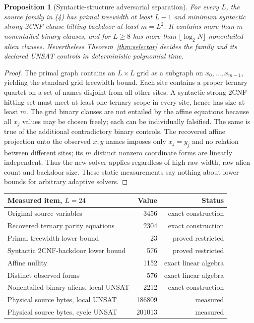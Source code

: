 \documentclass[11pt]{article}
\newtheorem{proposition}[theorem]{Proposition}
\begin{document}
\begin{proposition}[Syntactic-structure adversarial separation]
\label{prop:grid}
For every $L$, the source family in (4) has primal treewidth at least $L-1$
and minimum \emph{syntactic} strong-2CNF clause-hitting backdoor at least $m=L^2$.
It contains more than $m$ nonentailed binary clauses, and for $L\ge8$ has
more than $\lfloor\log_2 N\rfloor$ nonentailed alien clauses.
Nevertheless Theorem~\ref{thm:selector} decides the family and its declared
UNSAT controls in deterministic polynomial time.
\end{proposition}
\begin{proof}
The primal graph contains an $L\times L$ grid as a subgraph on
$x_0,\ldots,x_{m-1}$, yielding the standard grid treewidth bound.
Each site contains a proper ternary quartet on a set of names disjoint
from all other sites. A syntactic strong-2CNF hitting set must meet at
least one ternary scope in every site, hence has size at least $m$.
The grid binary clauses are not entailed by the affine equations because
all $x_j$ values may be chosen freely; each can be individually falsified.
The same is true of the additional contradictory binary controls.
The recovered affine projection onto the observed $x,y$ names imposes only
$x_j=y_j$ and no relation between different sites; its $m$ distinct
nonzero coordinate forms are linearly independent. Thus the new solver
applies regardless of high raw width, raw alien count and backdoor size.
These static measurements say nothing about lower bounds for arbitrary
adaptive solvers.
\end{proof}

\begin{center}
\begin{tabular}{lrr}\toprule
\textbf{Measured item, $L=24$} & \textbf{Value} & \textbf{Status}\\\midrule
Original source variables & 3456 & exact construction\\
Recovered ternary parity equations & 2304 & exact construction\\
Primal treewidth lower bound & 23 & proved restricted\\
Syntactic 2CNF-backdoor lower bound & 576 & proved restricted\\
Affine nullity & 1152 & exact linear algebra\\
Distinct observed forms & 576 & exact linear algebra\\
Nonentailed binary aliens, local UNSAT & 2212 & exact construction\\
Physical source bytes, local UNSAT & 186809 & measured\\
Physical source bytes, cycle UNSAT & 201013 & measured\\
\bottomrule\end{tabular}
\end{center}
\end{document}
